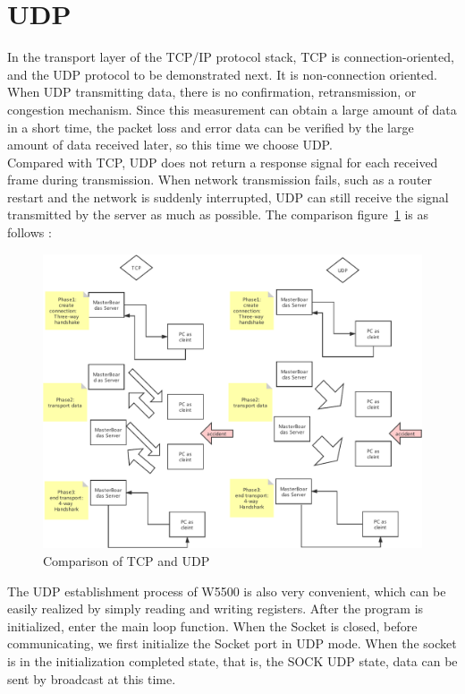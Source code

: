 \section{UDP}
\label{sec:UDP}
In the transport layer of the TCP/IP protocol stack, TCP is connection-oriented, and the UDP protocol to be demonstrated next. It is non-connection oriented.
\\
When UDP transmitting data, there is no confirmation, retransmission, or congestion mechanism. Since this measurement can obtain a large amount of data in a short time, the packet loss and error data can be verified by the large amount of data received later, so this time we choose UDP.
\\
Compared with TCP, UDP does not return a response signal for each received frame during transmission. When network transmission fails, such as a router restart and the network is suddenly interrupted, UDP can still receive the signal transmitted by the server as much as possible. The comparison figure~\ref{fig:2.11}  is as follows :
\begin{figure}[!ht]
	\centering
	\includegraphics[width=13cm]{grafiken/2.11.pdf}
	\caption{Comparison of TCP and UDP} 
	\label{fig:2.11}
\end{figure}
\FloatBarrier
The UDP establishment process of W5500 is also very convenient, which can be easily realized by simply reading and writing registers. After the program is initialized, enter the main loop function. When the Socket is closed, before communicating, we first initialize the Socket port in UDP mode. When the socket is in the initialization completed state, that is, the SOCK UDP state, data can be sent by broadcast at this time.
